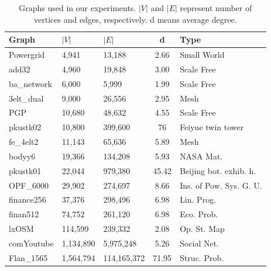\documentclass{vgtc}
\begin{document}
\begin{table}[]
\caption{Graphs used in our experiments. $|V|$ and $|E|$ represent number of vertices and edges, respectively. d means average degree.}
\vspace{-5pt}
\centering
\begin{tabular}{|p{1.35cm}|p{1.15cm}|p{1.34cm}|c|p{1.7cm}|}
\hline
\textbf{Graph} & \textbf{$|V|$} & \textbf{$|E|$} & \textbf{d} & \textbf{Type}\\ \hline
Powergrid             &      4,941	               &   13,188                &        	2.66              & Small World \\ \hline
add32            &     	4,960                &   	19,848                  & 	3.00       &   Scale Free  \\ \hline
ba\_network	           &      6,000	                &    5,999            &    	1.99                     & Scale Free \\ \hline
3elt\_dual	          & 9,000          & 	26,556	         &     2.95                  & Mesh \\ \hline
PGP           &         	10,680              &  	48,632	                &    4.55                 & Scale Free \\ \hline
pkustk02           &         	10,800             &      	399,600	             &        76              & Feiyue twin tower\\ \hline
fe\_4elt2	           &      11,143               &   	65,636	                & 5.89        &   Mesh  \\ \hline
bodyy6	           &        19,366              &    	134,208	                &        5.93             & NASA Mat.\\ \hline
pkustk01	            &       22,044               &         	979,380         &      	45.42               & Beijing bot. exhib. h. \\ \hline

OPF\_6000   &	29,902	&   274,697	    &   8.66    &  Ins. of Pow. Sys. G. U. \\ \hline
finance256	&   37,376	    &   298,496	    &   6.98    &   Lin. Prog. \\ \hline
finan512    &	74,752	    &   261,120	    &   6.98    &   Eco. Prob. \\ \hline
lxOSM	&   114,599 &	239,332 & 2.08 & Op. St. Map \\ \hline
comYoutube	&   1,134,890 &	5,975,248   & 5.26  & Social Net. \\ \hline
Flan\_1565	&   1,564,794	&   114,165,372   & 71.95  & Struc. Prob. \\ \hline
\end{tabular}
\label{tab:datasets}
\vspace{-0.5cm}
\end{table}
\end{document}
